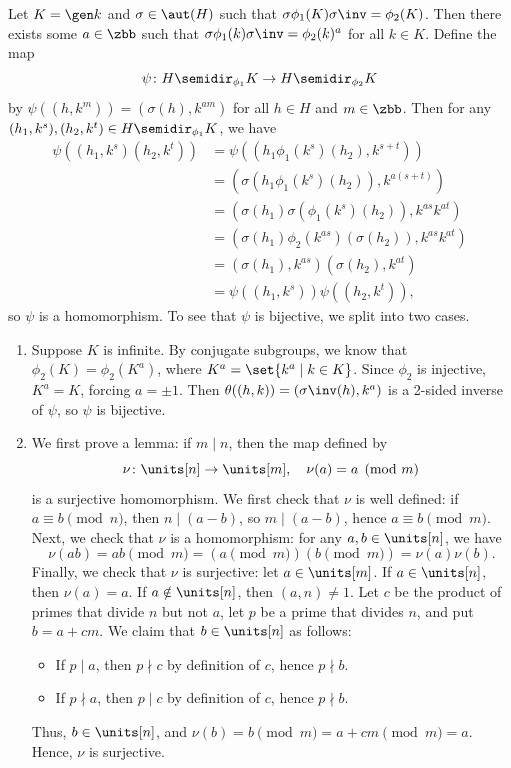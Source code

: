 \begin{sol}
    Let $K = \gen k$ and $\sigma \in \aut(H)$ such that $\sigma\phi_1(K)\sigma\inv = \phi_2(K)$.
	Then there exists some $a \in \zbb$ such that $\sigma\phi_1(k)\sigma\inv = \phi_2(k)^a$ for all $k \in K$.
	Define the map
    \[
    	\psi \colon H \semidir_{\phi_1} K \to H \semidir_{\phi_2} K
    \]
    by $\psi((h, k^m)) = (\sigma(h), k^{am})$ for all $h \in H$ and $m \in \zbb$.
	Then for any $(h_1, k^s), (h_2, k^t) \in H \semidir_{\phi_1} K$, we have
    \begin{align*}
        \psi((h_1, k^s)(h_2, k^t)) & = \psi((h_1\phi_1(k^s)(h_2), k^{s + t})) \\
        & = (\sigma(h_1\phi_1(k^s)(h_2)), k^{a(s + t)}) \\
        & = (\sigma(h_1)\sigma(\phi_1(k^s)(h_2)), k^{as}k^{at}) \\
        & = (\sigma(h_1)\phi_2(k^{as})(\sigma(h_2)), k^{as}k^{at}) \\
        & = (\sigma(h_1), k^{as})(\sigma(h_2), k^{at}) \\
        & = \psi((h_1, k^s))\psi((h_2, k^t)),
    \end{align*}
    so $\psi$ is a homomorphism.
	To see that $\psi$ is bijective, we split into two cases.
    \begin{enumerate}
        \item Suppose $K$ is infinite.
	By conjugate subgroups, we know that $\phi_2(K) = \phi_2(K^a)$, where $K^a = \set{k^a \mid k \in K}$.
	Since $\phi_2$ is injective, $K^a = K$, forcing $a = \pm 1$.
	Then $\theta((h, k)) = (\sigma\inv(h), k^a)$ is a 2-sided inverse of $\psi$, so $\psi$ is bijective.
        \item We first prove a lemma: if $m \mid n$, then the map defined by
        \[
        	\nu \colon \units[n] \to \units[m], \quad \nu(a) = a \pmod m
        \]
        is a surjective homomorphism.
	We first check that $\nu$ is well defined: if $a \equiv b \pmod n$, then $n \mid (a - b)$, so $m \mid (a - b)$, hence $a \equiv b \pmod m$.
	Next, we check that $\nu$ is a homomorphism: for any $a, b \in \units[n]$, we have
        \[
        	\nu(ab) = ab \pmod m = (a \pmod m)(b \pmod m) = \nu(a)\nu(b).
        \]
        Finally, we check that $\nu$ is surjective: let $a \in \units[m]$.
	If $a \in \units[n]$, then $\nu(a) = a$.
	If $a \notin \units[n]$, then $(a, n) \neq 1$.
	Let $c$ be the product of primes that divide $n$ but not $a$, let $p$ be a prime that divides $n$, and put $b = a + cm$.
	We claim that $b \in \units[n]$ as follows:
        \begin{itemize}
            \item If $p \mid a$, then $p \nmid c$ by definition of $c$, hence $p \nmid b$.
            \item If $p \nmid a$, then $p \mid c$ by definition of $c$, hence $p \nmid b$.
        \end{itemize}
        Thus, $b \in \units[n]$, and $\nu(b) = b \pmod m = a + cm \pmod m = a$.
	Hence, $\nu$ is surjective.
        

\end{enumerate}
\end{sol}
